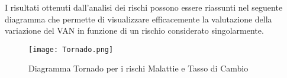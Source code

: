 I risultati ottenuti dall'analisi dei rischi possono essere riassunti nel seguente diagramma che permette di visualizzare efficacemente la valutazione della variazione del VAN in funzione di un rischio considerato singolarmente.
\begin{figure}[htbp]
\centering
\texttt{[image: Tornado.png]}
\caption{Diagramma Tornado per i rischi Malattie e Tasso di Cambio \label{fig:tornado}}
\end{figure}